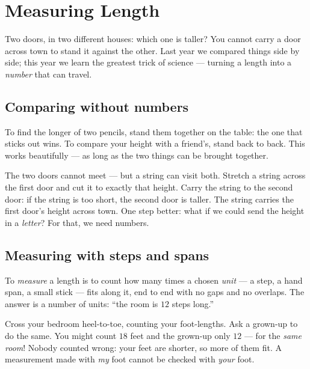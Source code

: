 \chapter{Measuring Length}\label{ch:g2:measuring-length}

Two doors, in two different houses: which one is taller? You cannot
carry a door across town to stand it against the other. Last year we
compared things side by side; this year we learn the greatest trick
of science --- turning a length into a \emph{number} that can travel.

\section{Comparing without numbers}

\begin{example}\label{ex:g2:measuring-length:sidebyside}
To find the longer of two pencils, stand them together on the table:
the one that sticks out wins. To compare your height with a friend's,
stand back to back. This works beautifully --- as long as the two
things can be brought together.
\end{example}

\begin{example}\label{ex:g2:measuring-length:string}
The two doors cannot meet --- but a string can visit both. Stretch a
string across the first door and cut it to exactly that height. Carry
the string to the second door: if the string is too short, the second
door is taller. The string carries the first door's height across
town. One step better: what if we could send the height in a
\emph{letter}? For that, we need numbers.
\end{example}

\section{Measuring with steps and spans}

\begin{definition}\label{def:g2:measuring-length:measure}
To \emph{measure} a length is to count how many times
a chosen \emph{unit} --- a step, a hand span, a small
stick --- fits along it, end to end with no gaps and no overlaps. The
answer is a number of units: ``the room is $12$ steps long.''
\end{definition}

\begin{example}\label{ex:g2:measuring-length:pace}
Cross your bedroom heel-to-toe, counting your foot-lengths. Ask a
grown-up to do the same. You might count $18$ feet and the grown-up
only $12$ --- for the \emph{same room}! Nobody counted wrong: your
feet are shorter, so more of them fit. A measurement made with
\emph{my} foot cannot be checked with \emph{your} foot.
\end{example}


